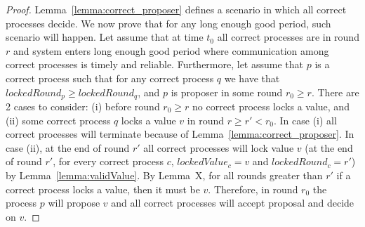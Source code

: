 \begin{proof}
Lemma~\ref{lemma:correct_proposer} defines a scenario in which all correct processes decide. We now prove that for any long enough good period, such scenario will happen. Let assume that at time $t_0$ all correct processes are in round $r$ and system enters long enough good period where communication among correct processes is timely and reliable. Furthermore, let assume that $p$ is a correct process such that for any correct process $q$ we have that $lockedRound_p \ge lockedRound_q$, and $p$ is proposer in some round $r_0 \ge r$. There are 2 cases to consider: (i) before round $r_0 \ge r$ no correct process locks a value, and (ii) some correct process $q$ locks a value $v$ in round $r \ge r' < r_0$. In case (i) all correct processes will terminate because of Lemma~\ref{lemma:correct_proposer}. In case (ii), at the end of round $r'$ all correct processes will lock value $v$ (at the end of round $r'$, for every correct process $c$, $lockedValue_c = v$ and $lockedRound_c = r'$) by Lemma~\ref{lemma:validValue}. By Lemma~X, for all rounds greater than $r'$ if a correct process locks a value, then it must be $v$. Therefore, in round $r_0$ the process $p$ will propose $v$ and all correct processes will accept proposal and decide on $v$.       
\end{proof}	

